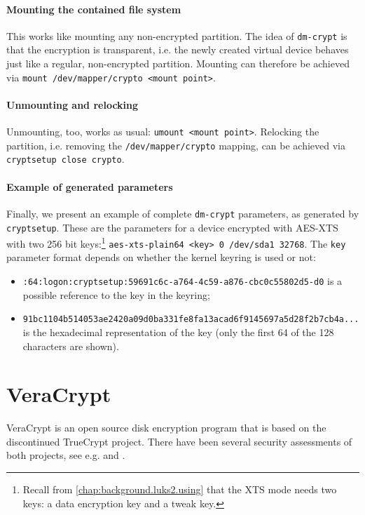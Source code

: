 \paragraph{Mounting the contained file system}
This works like mounting any non-encrypted partition. The idea of \texttt{dm-crypt} is that the encryption is transparent, i.e. the newly created virtual device behaves just like a regular, non-encrypted partition. Mounting can therefore be achieved via \texttt{mount /dev/mapper/crypto <mount point>}.

\paragraph{Unmounting and relocking}
Unmounting, too, works as usual: \texttt{umount <mount point>}. Relocking the partition, i.e. removing the \texttt{/dev/mapper/crypto} mapping, can be achieved via \texttt{cryptsetup close crypto}.

\paragraph{Example of generated parameters} Finally, we present an example of complete \texttt{dm-crypt} parameters, as generated by \texttt{cryptsetup}. These are the parameters for a device encrypted with AES-XTS with two 256 bit keys:\footnote{\label{fn:otherapproaches.linux.aesxtskeys} Recall from \autoref{chap:background.luks2.using} that the XTS mode needs two keys: a data encryption key and a tweak key.} \texttt{aes-xts-plain64 <key> 0 /dev/sda1 32768}. The \texttt{key} parameter format depends on whether the kernel keyring is used or not:
\begin{itemize}
	\item \texttt{:64:logon:cryptsetup:59691c6c-a764-4c59-a876-cbc0c55802d5-d0} is a possible reference to the key in the keyring;
	\item \texttt{91bc1104b514053ae2420a09d0ba331fe8fa13acad6f9145697a5d28f2b7cb4a...} is the hexadecimal representation of the key (only the first 64 of the 128 characters are shown).
\end{itemize}

\section{VeraCrypt}
\label{chap:otherapproaches.veracrypt}
VeraCrypt is an open source disk encryption program that is based on the discontinued TrueCrypt project. There have been several security assessments of both projects, see e.g. \cite{Quarkslab2016} and \cite{Fraunhofer2020}.

